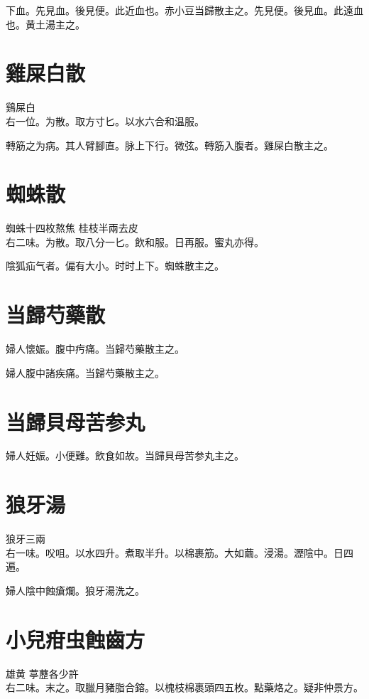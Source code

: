 下血。先見血。後見便。此近血也。赤小豆当歸散主之。先見便。後見血。此遠血也。黄土湯主之。

\section{雞屎白散}

鷄屎白\\
右一位。为散。取方寸匕。以水六合和温服。

轉筋之为病。其人臂腳直。脉上下行。微弦。轉筋入腹者。雞屎白散主之。

\section{蜘蛛散}

蜘蛛{\scriptsize 十四枚熬焦} 桂枝{\scriptsize 半兩去皮}\\
右二味。为散。取八分一匕。飲和服。日再服。蜜丸亦得。

陰狐疝气者。偏有大小。时时上下。蜘蛛散主之。

\section{当歸芍藥散}

婦人懷娠。腹中㽲痛。当歸芍藥散主之。

婦人腹中諸疾痛。当歸芍藥散主之。

\section{当歸貝母苦参丸}

{\khaaitp 婦人}妊娠。小便難。飲食如故。{\khaaitp 当}歸{\khaaitp 貝}母苦参丸主之。

\section{狼牙湯}

狼牙{\scriptsize 三兩}\\
右一味。㕮咀。以水四升。煮取半升。以棉裹筋。大如繭。浸湯。瀝陰中。日四遍。

{\khaaitp 婦人}陰中蝕瘡爛。狼牙湯洗之。

\section{小兒疳虫蝕齒方}

雄黄{ }葶藶{\scriptsize 各少許}\\
右二味。末之。取臘月豬脂合鎔。以槐枝棉裹頭四五枚。點藥烙之。{\scriptsize 疑非仲景方。}

